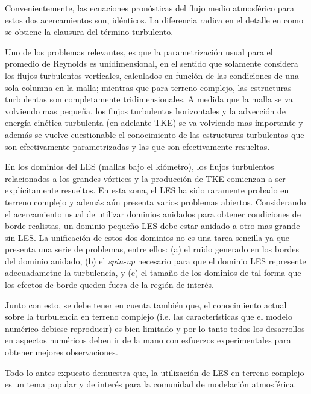 Convenientemente, las ecuaciones pronósticas del flujo medio atmosférico para estos dos acercamientos son, idénticos. La diferencia radica en el detalle en como se obtiene la clausura del término turbulento.

Uno de los problemas relevantes, es que la parametrización usual para el promedio de Reynolds es unidimensional, en el sentido que solamente considera los flujos turbulentos verticales, calculados en función de las condiciones de una sola columna en la malla; mientras que para terreno complejo, las estructuras turbulentas son completamente tridimensionales. A medida que la malla se va volviendo mas pequeña, los flujos turbulentos horizontales y la advección de energía cinética turbulenta (en adelante TKE) se va volviendo mas importante y además se vuelve cuestionable el conocimiento de las estructuras turbulentas que son efectivamente parametrizadas y las que son efectivamente resueltas. 

En los dominios del LES (mallas bajo el kiómetro), los flujos turbulentos relacionados a los grandes vórtices y la producción de TKE comienzan a ser explícitamente resueltos. En esta zona, el LES ha sido raramente probado en terreno complejo y además aún presenta varios problemas abiertos. Considerando el acercamiento usual de utilizar dominios anidados para obtener condiciones de borde realistas, un dominio pequeño LES debe estar anidado a otro mas grande sin LES. La unificación de estos dos dominios no es una tarea sencilla ya que presenta una serie de problemas, entre ellos: (a) el ruido generado en los bordes del dominio anidado, (b) el \emph{spin-up} necesario para que el dominio LES represente adecuadametne la turbulencia, y (c) el tamaño de los dominios de tal forma que los efectos de borde queden fuera de la región de interés.

Junto con esto, se debe tener en cuenta también que, el conocimiento actual sobre la turbulencia en terreno complejo (i.e. las características que el modelo numérico debiese reproducir) es bien limitado y por lo tanto todos los desarrollos en aspectos numéricos deben ir de la mano con esfuerzos experimentales para obtener mejores observaciones.

Todo lo antes expuesto demuestra que, la utilización de LES en terreno complejo es un tema popular y de interés para la comunidad de modelación atmosférica.

